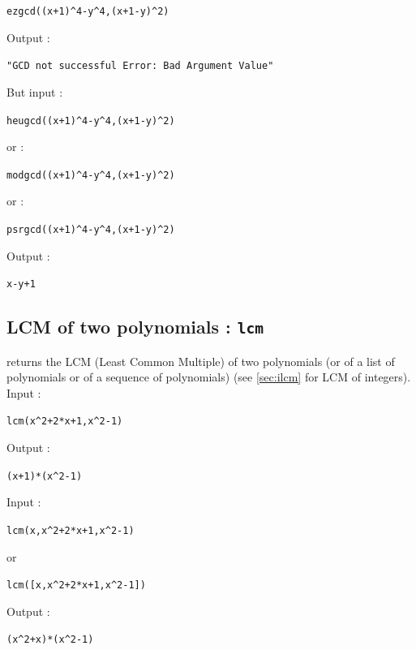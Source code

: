 \documentclass[a4paper,11pt]{book}
\begin{document}
\begin{center}{\tt ezgcd((x+1)\verb|^|4-y\verb|^|4,(x+1-y)\verb|^|2)}\end{center}
Output :
\begin{center}{\tt "GCD not successful Error: Bad Argument Value"}\end{center}
 But input :
\begin{center}{\tt heugcd((x+1)\verb|^|4-y\verb|^|4,(x+1-y)\verb|^|2)}\end{center}
or :
\begin{center}{\tt modgcd((x+1)\verb|^|4-y\verb|^|4,(x+1-y)\verb|^|2)}\end{center}
or :
\begin{center}{\tt psrgcd((x+1)\verb|^|4-y\verb|^|4,(x+1-y)\verb|^|2)}\end{center}
Output :
\begin{center}{\tt x-y+1 }\end{center} 

\subsection{LCM of two polynomials : {\tt lcm}}\label{sec:lcm}
 returns the LCM (Least Common Multiple) of two polynomials
(or of a list of polynomials or of a sequence of polynomials)
(see \ref{sec:ilcm} for LCM of integers).\\
Input :
\begin{center}{\tt lcm(x\verb|^|2+2*x+1,x\verb|^|2-1)}\end{center}
Output :
\begin{center}{\tt  (x+1)*(x\verb|^|2-1)}\end{center}
Input :
\begin{center}{\tt lcm(x,x\verb|^|2+2*x+1,x\verb|^|2-1)}\end{center}
or
\begin{center}{\tt lcm([x,x\verb|^|2+2*x+1,x\verb|^|2-1])}\end{center}
Output :
\begin{center}{\tt (x\verb|^|2+x)*(x\verb|^|2-1)}\end{center}
\end{document}
